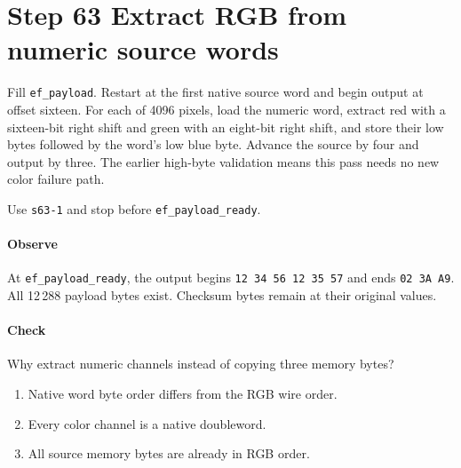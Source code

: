 \section{Step 63 Extract RGB from numeric source words}
Fill \texttt{ef\_payload}. Restart at the first native source word and begin output at offset sixteen. For each of 4096 pixels, load the numeric word, extract red with a sixteen-bit right shift and green with an eight-bit right shift, and store their low bytes followed by the word's low blue byte. Advance the source by four and output by three. The earlier high-byte validation means this pass needs no new color failure path.

Use \texttt{s63-1} and stop before \texttt{ef\_payload\_ready}.

\paragraph{Observe} At \texttt{ef\_payload\_ready}, the output begins \texttt{12 34 56 12 35 57} and ends \texttt{02 3A A9}. All 12\,288 payload bytes exist. Checksum bytes remain at their original values.

\paragraph{Check} Why extract numeric channels instead of copying three memory bytes?
\begin{enumerate}[label=\Alph*.]
  \item Native word byte order differs from the RGB wire order.
  \item Every color channel is a native doubleword.
  \item All source memory bytes are already in RGB order.
\end{enumerate}
